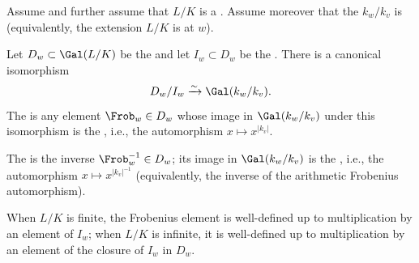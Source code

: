 \begin{definition} \label{definition:frobenius_element_of_a_galois_extension_of_valuation_fields}
    Assume  and further assume that $L/K$ is a . Assume moreover that the  $k_w / k_v$ is  (equivalently, the extension $L/K$ is  at $w$).

    Let $D_w \subset \Gal(L/K)$ be the  and let $I_w \subset D_w$ be the . There is a canonical isomorphism
    $$D_w / I_w \xrightarrow{\sim} \Gal(k_w / k_v).$$
    The  is any element $\Frob_{w} \in D_w$ whose image in $\Gal(k_w / k_v)$ under this isomorphism is the , i.e., the automorphism $x \mapsto x^{|k_v|}$.

    The  is the inverse $\Frob_{w}^{-1} \in D_w$; its image in $\Gal(k_w / k_v)$ is the , i.e., the automorphism $x \mapsto x^{|k_v|^{-1}}$ (equivalently, the inverse of the arithmetic Frobenius automorphism).

    When $L/K$ is finite, the Frobenius element is well-defined up to multiplication by an element of $I_w$; when $L/K$ is infinite, it is well-defined up to multiplication by an element of the closure of $I_w$ in $D_w$.

\end{definition}